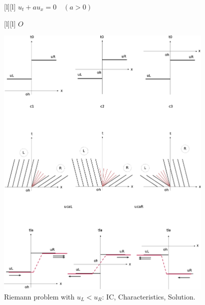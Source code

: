 \begin{figure}[ht]
	[l] {$\displaystyle u_{t} + au_{x} = 0 \quad (a>0)$}





	[l] {$O$}

	\includegraphics[width=0.93\textwidth]{RiemannAllCasesRL.eps}
	\caption{Riemann problem with $u_{L} < u_{R}$:  IC, Characteristics, Solution.}
	\label{\LABEL}
\end{figure}